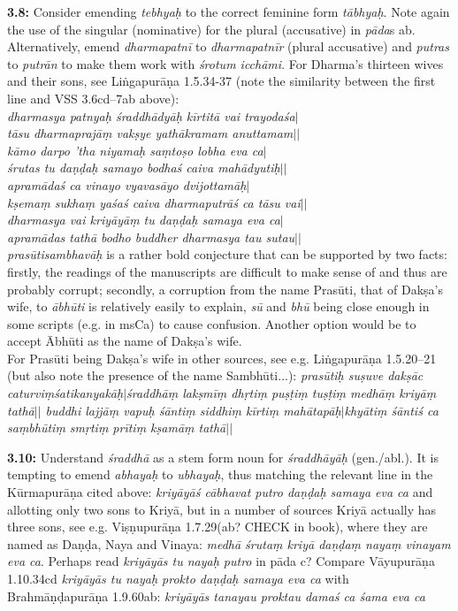 \documentclass{article}
\newcommand{\vsnum}[1]{\textbf{#1}}
\newcommand{\skt}[1]{\textit{#1}}
\newcommand{\msCa}{msCa}
\begin{document}
\vsnum{3.8: }Consider emending \skt{tebhyaḥ} to the correct feminine form \skt{tābhyaḥ}. Note again the use of the singular (nominative) for the plural (accusative) in \skt{pāda}s ab. Alternatively, emend \skt{dharmapatnī} to \skt{dharmapatnīr} (plural accusative) and \skt{putras} to \skt{putrān} to make them work with \skt{śrotum icchāmi}. For Dharma's thirteen wives and their sons, see Liṅgapurāṇa 1.5.34-37 (note the similarity between the first line and VSS 3.6cd--7ab above): \\ \skt{dharmasya patnyaḥ śraddhādyāḥ kīrtitā vai trayodaśa$|$\\tāsu dharmaprajāṃ vakṣye yathākramam{ }anuttamam$||$ \\kāmo darpo 'tha niyamaḥ saṃtoṣo lobha eva ca$|$\\śrutas{ }tu daṇḍaḥ samayo bodhaś{ }caiva mahādyutiḥ$||$ \\apramādaś{ }ca vinayo vyavasāyo dvijottamāḥ$|$\\kṣemaṃ sukhaṃ yaśaś{ }caiva dharmaputrāś{ }ca tāsu vai$||$ \\dharmasya vai kriyāyāṃ tu daṇḍaḥ samaya eva ca$|$\\apramādas{ }tathā bodho buddher{ }dharmasya tau sutau$||$}  \\\skt{prasūtisambhavāḥ} is a rather bold conjecture that can be supported by two facts: firstly, the readings of the manuscripts are difficult to make sense of and thus are probably corrupt; secondly, a corruption from the name Prasūti, that of Dakṣa's wife, to \skt{ābhūti} is relatively easily to explain, \skt{sū} and \skt{bhū} being close enough in some scripts (e.g. in \msCa) to cause confusion. Another option would be to accept Ābhūti as the name of Dakṣa's wife. \\ For Prasūti being Dakṣa's wife in other sources, see e.g. Liṅgapurāṇa 1.5.20--21 (but also note the presence of the name Sambhūti...): \skt{prasūtiḥ suṣuve dakṣāc{ }caturviṃśatikanyakāḥ$|$śraddhāṃ lakṣmīṃ dhṛtiṃ puṣṭiṃ tuṣṭiṃ medhāṃ kriyāṃ tathā$||$ buddhi lajjāṃ vapuḥ śāntiṃ siddhiṃ kīrtiṃ mahātapāḥ$|$khyātiṃ śāntiś{ }ca saṃbhūtiṃ smṛtiṃ prītiṃ kṣamāṃ tathā$||$}

\vsnum{3.10: }Understand \skt{śraddhā} as a stem form noun for \skt{śraddhāyāḥ} (gen./abl.). It is tempting to emend \skt{abhayaḥ} to \skt{ubhayaḥ}, thus matching the relevant line in the Kūrmapurāṇa cited above: \skt{kriyāyāś cābhavat putro daṇḍaḥ samaya eva ca} and allotting only two sons to Kriyā, but in a number of sources Kriyā actually has three sons, see e.g. Viṣṇupurāṇa 1.7.29(ab? CHECK in book), where they are named as Daṇḍa, Naya and Vinaya: \skt{medhā śrutaṃ kriyā daṇḍaṃ nayaṃ vinayam eva ca}. Perhaps read \skt{kriyāyās tu nayaḥ putro} in pāda c? Compare Vāyupurāṇa 1.10.34cd \skt{kriyāyās tu nayaḥ prokto daṇḍaḥ samaya eva ca} with Brahmāṇḍapurāṇa 1.9.60ab: \skt{kriyāyās tanayau proktau damaś ca śama eva ca}
\end{document}
